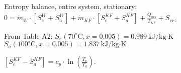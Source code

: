 Entropy balance, entire system, stationary:  
\( 0 = \dot{m}_W \cdot [S_e^W + S_a^W] + \dot{m}_{KF} \cdot [S_e^{KF} + S_a^{KF}] + \frac{\dot{Q}_{ms}}{T_{KF}} + \dot{S}_{erz} \)  

From Table A2:  
\( S_e (70^\circ \text{C}, x = 0.005) = 0.989 \, \text{kJ/kg·K} \)  
\( S_a (100^\circ \text{C}, x = 0.005) = 1.837 \, \text{kJ/kg·K} \)  

\( [S_e^{KF} - S_a^{KF}] = c_p \cdot \ln \left( \frac{T_e}{T_a} \right) \).